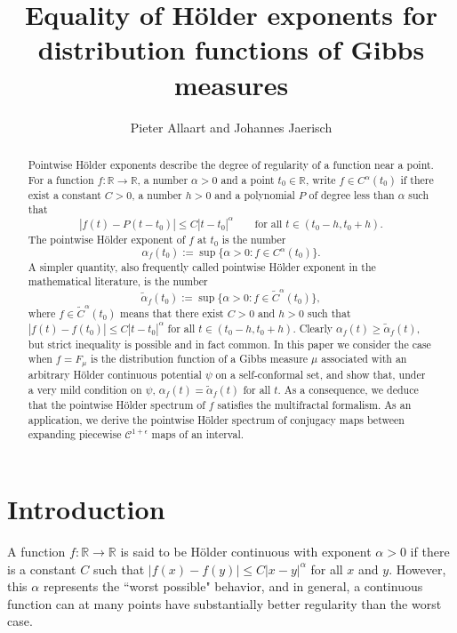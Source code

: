 \documentclass[11pt]{amsart}
\title[Equality of H\"older exponents]{Equality of H\"older exponents for distribution functions of Gibbs measures}
\author{Pieter Allaart and Johannes Jaerisch}
\newcommand\RR{\mathbb{R}}
\newcommand{\1}{1}
\begin{document}
\begin{abstract}
Pointwise H\"older exponents describe the degree of regularity of a function near a point. For a function $f:\mathbb{R}\to\mathbb{R}$, a number $\alpha>0$ and a point $t_0\in\mathbb{R}$, write $f\in C^\alpha(t_0)$ if there exist a constant $C>0$, {a number $h>0$} and a polynomial $P$ of degree less than $\alpha$ such that
\[
|f(t)-P(t-t_0)|\leq C|t-t_0|^\alpha \qquad\mbox{for all {$t\in (t_0-h,t_0+h)$}}.
\]
The pointwise H\"older exponent of $f$ at $t_0$ is the number
\[
\alpha_f(t_0):=\sup\{\alpha>0: f\in C^\alpha(t_0)\}.
\]
A simpler quantity, also frequently called pointwise H\"older exponent in the mathematical literature, is the number
\[
\tilde{\alpha}_f(t_0):=\sup\{\alpha>0: f\in \tilde{C}^\alpha(t_0)\},
\]
where $f\in \tilde{C}^\alpha(t_0)$ means that there {exist $C>0$ and $h>0$} such that $|f(t)-f(t_0)|\leq C|t-t_0|^\alpha$ for all {$t\in (t_0-h,t_0+h)$}.
Clearly $\alpha_f(t)\geq \tilde{\alpha}_f(t)$, but strict inequality is possible and in fact common. In this paper we consider the case when $f=F_\mu$ is the distribution function of a Gibbs measure $\mu$ associated with an arbitrary H\"older continuous potential $\psi$ on a self-conformal set, and show that, under a very mild condition on $\psi$, $\alpha_f(t)=\tilde{\alpha}_f(t)$ for all $t$. As a consequence, we deduce that the pointwise H\"older spectrum of $f$ satisfies the multifractal formalism. As an application, we derive the pointwise H\"older spectrum of conjugacy maps between expanding piecewise $\mathcal{C}^{1+\epsilon}$ maps of an interval.
\end{abstract}

\maketitle


\section{Introduction}

A function $f:\RR\to\RR$ is said to be H\"older continuous with exponent $\alpha>0$ if there is a constant $C$ such that $|f(x)-f(y)|\leq C|x-y|^\alpha$ for all $x$ and $y$. However, this $\alpha$ represents the ``worst possible" behavior, and in general, a continuous function can at many points have substantially better regularity than the worst case. 
\end{document}
